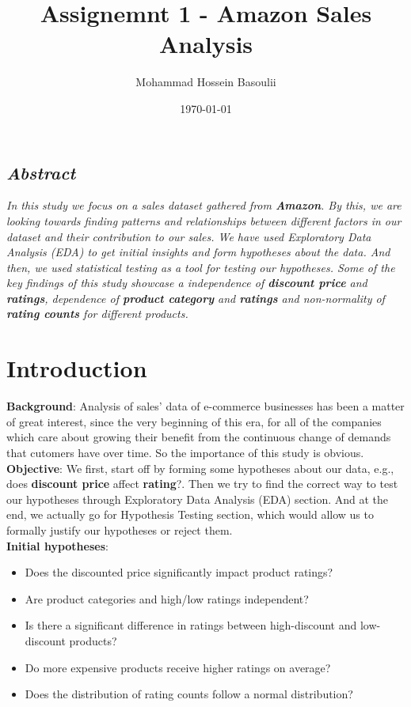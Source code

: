 \documentclass[a4paper,12pt]{article}
\begin{document}
\title{Assignemnt 1 - Amazon Sales Analysis}
\author{Mohammad Hossein Basoulii}
\date{\today}
\maketitle

\begin{center}
    \section*{\textit{Abstract}}
    \textit{In this study we focus on a sales dataset gathered from \textbf{Amazon}. 
    By this, we are looking towards finding patterns and relationships between different factors in our dataset and their contribution to our sales. 
    We have used Exploratory Data Analysis (EDA) to get initial insights and form hypotheses about the data. 
    And then, we used statistical testing as a tool for testing our hypotheses. 
    Some of the key findings of this study showcase a independence of \textbf{discount price} and \textbf{ratings}, 
    dependence of \textbf{product category} and \textbf{ratings} and non-normality of \textbf{rating counts} for different products.}
\end{center}


\section*{Introduction}
\textbf{Background}: Analysis of sales' data of e-commerce businesses has been a matter of great interest, since the very beginning of this era, for all of the companies which care about growing their benefit from the continuous change of demands that cutomers have over time. So the importance of this study is obvious. \\

\noindent\textbf{Objective}: We first, start off by forming some hypotheses about our data, e.g., does \textbf{discount price} affect \textbf{rating}?.  Then we try to find the correct way to test our hypotheses through Exploratory Data Analysis (EDA) section. And at the end, we actually go for Hypothesis Testing section, which would allow us to formally justify our hypotheses or reject them. \\

\noindent\textbf{Initial hypotheses}:
\begin{itemize}
    \item Does the discounted price significantly impact product ratings?
    \item Are product categories and high/low ratings independent?
    \item Is there a significant difference in ratings between high-discount and low-discount products?
    \item Do more expensive products receive higher ratings on average?
    \item Does the distribution of rating counts follow a normal distribution?
\end{itemize}
\end{document}
